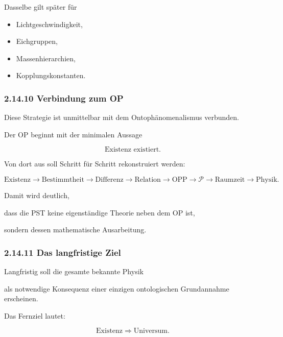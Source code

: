 Dasselbe gilt später für

\begin{itemize}

\item Lichtgeschwindigkeit,

\item Eichgruppen,

\item Massenhierarchien,

\item Kopplungskonstanten.

\end{itemize}


\subsubsection*{2.14.10 Verbindung zum OP}

Diese Strategie ist unmittelbar mit dem Ontophänomenalismus verbunden.

Der OP beginnt mit der minimalen Aussage

\[
\boxed{
\text{Existenz existiert.}
}
\]

Von dort aus soll Schritt für Schritt rekonstruiert werden:

\[
\text{Existenz}
\rightarrow
\text{Bestimmtheit}
\rightarrow
\text{Differenz}
\rightarrow
\text{Relation}
\rightarrow
\text{OPP}
\rightarrow
\mathcal P
\rightarrow
\text{Raumzeit}
\rightarrow
\text{Physik}.
\]

Damit wird deutlich,

dass die PST keine eigenständige Theorie neben dem OP ist,

sondern dessen mathematische Ausarbeitung.


\subsubsection*{2.14.11 Das langfristige Ziel}

Langfristig soll die gesamte bekannte Physik

als notwendige Konsequenz einer einzigen ontologischen Grundannahme erscheinen.

Das Fernziel lautet:

\[
\boxed{
\text{Existenz}
\Longrightarrow
\text{Universum}.
}
\]

